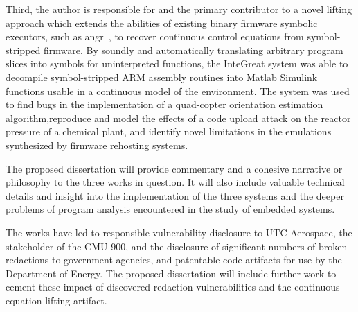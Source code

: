 \noindent
Third, the author is responsible for and the primary contributor to a novel lifting approach which extends the abilities of existing binary firmware symbolic executors, such as angr~\cite{wang2017angr}, to recover continuous control equations from symbol-stripped firmware.
By soundly and automatically translating arbitrary program slices into symbols for uninterpreted functions, the InteGreat system was able to decompile symbol-stripped ARM assembly routines into Matlab Simulink functions usable in a continuous model of the environment. 
The system was used to find bugs in the implementation of a quad-copter orientation estimation algorithm,reproduce and model the effects of a code upload attack on the reactor pressure of a chemical plant, and identify novel limitations in the emulations synthesized by firmware rehosting systems.


\noindent The proposed dissertation will provide commentary and a cohesive narrative or philosophy to the three works in question. It will also include valuable technical details and insight into the implementation of the three systems and the deeper problems of program analysis encountered in the study of embedded systems.


\noindent The works have led to responsible vulnerability disclosure to UTC Aerospace, the stakeholder of the CMU-900, and the disclosure of significant numbers of broken redactions to government agencies, and patentable code artifacts for use by the Department of Energy. The proposed dissertation will include further work to cement these impact of discovered redaction vulnerabilities and the continuous equation lifting artifact.
